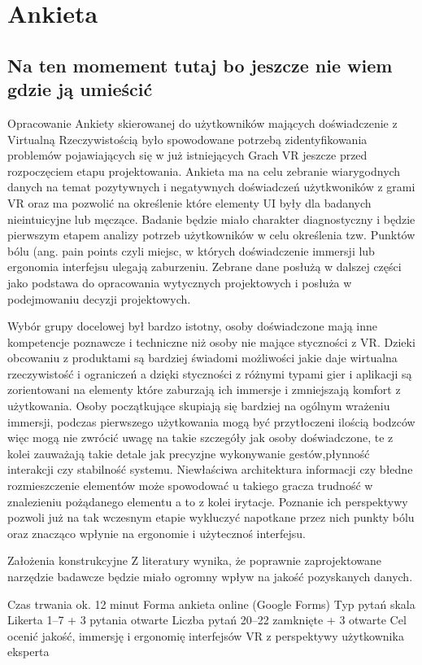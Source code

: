 \chapter{Ankieta}
\section{Na ten momement tutaj bo jeszcze nie wiem gdzie ją umieścić}
Opracowanie Ankiety skierowanej do użytkowników mających doświadczenie z Virtualną Rzeczywistością było spowodowane potrzebą zidentyfikowania problemów pojawiających się w już istniejących Grach VR jeszcze przed rozpoczęciem etapu projektowania. Ankieta ma na celu zebranie wiarygodnych danych na temat pozytywnych i negatywnych doświadczeń użytkwoników z grami VR oraz ma pozwolić na określenie które elementy UI były dla badanych nieintuicyjne lub męczące. Badanie będzie miało charakter diagnostyczny i będzie pierwszym etapem analizy potrzeb użytkowników w celu określenia tzw. Punktów bólu (ang. pain points czyli miejsc, w których doświadczenie immersji lub ergonomia interfejsu ulegają zaburzeniu. Zebrane dane posłużą w dalszej części jako podstawa do opracowania wytycznych projektowych i posłuża w podejmowaniu decyzji projektowych.

Wybór grupy docelowej był bardzo istotny, osoby doświadczone mają inne kompetencje poznawcze i techniczne niż osoby nie mające styczności z VR. Dzieki obcowaniu z produktami są bardziej świadomi możliwości jakie daje wirtualna rzeczywistość i ograniczeń a dzięki styczności z różnymi typami gier i aplikacji są zorientowani na elementy które zaburzają ich immersje i zmniejszają komfort z użytkowania. Osoby początkujące skupiają się bardziej na ogólnym wrażeniu immersji, podczas pierwszego użytkowania mogą być przytłoczeni ilością bodzców więc mogą nie zwrócić uwagę na takie szczegóły jak osoby doświadczone, te z kolei zauważają takie detale jak precyzjne wykonywanie gestów,płynność interakcji czy stabilność systemu. Niewłaściwa architektura informacji  czy błedne rozmieszczenie elementów może spowodować u takiego gracza trudność w znalezieniu pożądanego elementu a to z kolei irytacje. Poznanie ich perspektywy pozwoli już na tak wczesnym etapie wykluczyć napotkane przez nich punkty bólu oraz znacząco wpłynie na ergonomie i użytecznoś interfejsu. 

Założenia konstrukcyjne
Z literatury wynika, że poprawnie zaprojektowane narzędzie badawcze będzie miało ogromny wpływ na jakość pozyskanych danych.

Czas trwania	ok. 12 minut
Forma	ankieta online (Google Forms)
Typ pytań	skala Likerta 1–7 + 3 pytania otwarte
Liczba pytań	20–22 zamknięte + 3 otwarte
Cel	ocenić jakość, immersję i ergonomię interfejsów VR z perspektywy użytkownika eksperta

